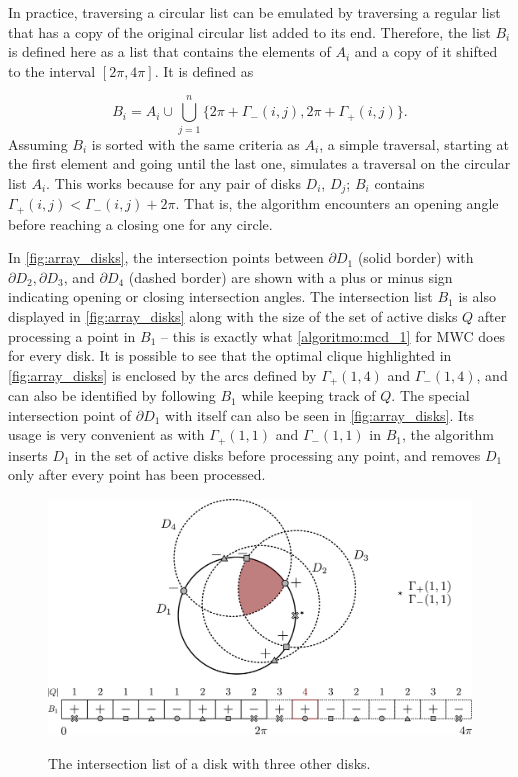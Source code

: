 In practice, traversing a circular list can be emulated by traversing a regular list that has a copy of the original circular list added to its end. 
Therefore, the list $B_i$ is defined here as a list that contains the elements of $A_i$ and a copy of it shifted to the interval $[2\pi, 4\pi]$. It is defined as

\begin{equation}\label{eq:b_i}
B_i = A_i\cup\bigcup_{j=1}^n \{ 2\pi+\Gamma_-(i,j), 2\pi+\Gamma_+(i,j) \}.
\end{equation}
Assuming $B_i$ is sorted with the same criteria as $A_i$, a simple traversal, starting at the first element and going until the last one, simulates a traversal on the circular list $A_i$.
This works because for any pair of disks $D_i$, $D_j$; $B_i$ contains $\Gamma_+(i,j) < \Gamma_-(i,j) + 2\pi$. That is, the algorithm encounters an opening angle before reaching a closing one for any circle.

In \autoref{fig:array_disks}, the intersection points between $\partial D_1$ (solid border) with $\partial D_2, \partial D_3$, and $\partial D_4$ (dashed border) are shown with a plus or minus sign indicating opening or closing intersection angles. 
The intersection list $B_1$ is also displayed in \autoref{fig:array_disks} along with the size of the set of active disks $Q$ after processing a point in $B_1$ -- this is exactly what \autoref{algoritmo:mcd_1} for MWC does for every disk. 
It is possible to see that the optimal clique highlighted in \autoref{fig:array_disks} is enclosed by the arcs defined by $\Gamma_+(1,4)$ and $\Gamma_-(1,4)$, and can also be identified by following $B_1$ while keeping track of $Q$.
The special intersection point of $\partial D_1$ with itself can also be seen in \autoref{fig:array_disks}. Its usage is very convenient as with $\Gamma_+(1, 1)$ and $\Gamma_-(1,1)$  in $B_1$, the algorithm inserts $D_1$ in the set of active disks before processing any point, and removes $D_1$ only after every point has been processed.
\begin{figure}[H]
	\centering
	
	\caption{The intersection list of a disk with three other disks.}
	\includegraphics[scale=.3]{tex/figures/3_disks_intersect2.pdf}
	\fautor
	\label{fig:array_disks}
\end{figure}

